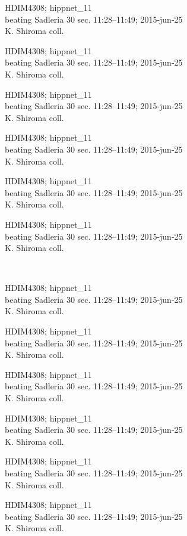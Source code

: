 \documentclass[2pt]{extarticle}
\begin{document}
\noindent
\parbox{0.16\textwidth}{\tiny \raggedright \rule[-0.3\baselineskip]{0pt}{10pt}HDIM4308; hippnet\_11\\ beating Sadleria 30 sec. 11:28--11:49; 2015-jun-25\\ K. Shiroma coll.}
\parbox{0.16\textwidth}{\tiny \raggedright \rule[-0.3\baselineskip]{0pt}{10pt}HDIM4308; hippnet\_11\\ beating Sadleria 30 sec. 11:28--11:49; 2015-jun-25\\ K. Shiroma coll.}
\parbox{0.16\textwidth}{\tiny \raggedright \rule[-0.3\baselineskip]{0pt}{10pt}HDIM4308; hippnet\_11\\ beating Sadleria 30 sec. 11:28--11:49; 2015-jun-25\\ K. Shiroma coll.}
\parbox{0.16\textwidth}{\tiny \raggedright \rule[-0.3\baselineskip]{0pt}{10pt}HDIM4308; hippnet\_11\\ beating Sadleria 30 sec. 11:28--11:49; 2015-jun-25\\ K. Shiroma coll.}
\parbox{0.16\textwidth}{\tiny \raggedright \rule[-0.3\baselineskip]{0pt}{10pt}HDIM4308; hippnet\_11\\ beating Sadleria 30 sec. 11:28--11:49; 2015-jun-25\\ K. Shiroma coll.}
\parbox{0.16\textwidth}{\tiny \raggedright \rule[-0.3\baselineskip]{0pt}{10pt}HDIM4308; hippnet\_11\\ beating Sadleria 30 sec. 11:28--11:49; 2015-jun-25\\ K. Shiroma coll.} \\ 
\vspace{0.001in} 

\noindent
\parbox{0.16\textwidth}{\tiny \raggedright \rule[-0.3\baselineskip]{0pt}{10pt}HDIM4308; hippnet\_11\\ beating Sadleria 30 sec. 11:28--11:49; 2015-jun-25\\ K. Shiroma coll.}
\parbox{0.16\textwidth}{\tiny \raggedright \rule[-0.3\baselineskip]{0pt}{10pt}HDIM4308; hippnet\_11\\ beating Sadleria 30 sec. 11:28--11:49; 2015-jun-25\\ K. Shiroma coll.}
\parbox{0.16\textwidth}{\tiny \raggedright \rule[-0.3\baselineskip]{0pt}{10pt}HDIM4308; hippnet\_11\\ beating Sadleria 30 sec. 11:28--11:49; 2015-jun-25\\ K. Shiroma coll.}
\parbox{0.16\textwidth}{\tiny \raggedright \rule[-0.3\baselineskip]{0pt}{10pt}HDIM4308; hippnet\_11\\ beating Sadleria 30 sec. 11:28--11:49; 2015-jun-25\\ K. Shiroma coll.}
\parbox{0.16\textwidth}{\tiny \raggedright \rule[-0.3\baselineskip]{0pt}{10pt}HDIM4308; hippnet\_11\\ beating Sadleria 30 sec. 11:28--11:49; 2015-jun-25\\ K. Shiroma coll.}
\parbox{0.16\textwidth}{\tiny \raggedright \rule[-0.3\baselineskip]{0pt}{10pt}HDIM4308; hippnet\_11\\ beating Sadleria 30 sec. 11:28--11:49; 2015-jun-25\\ K. Shiroma coll.} \\ 
\vspace{0.001in} 
\end{document}
